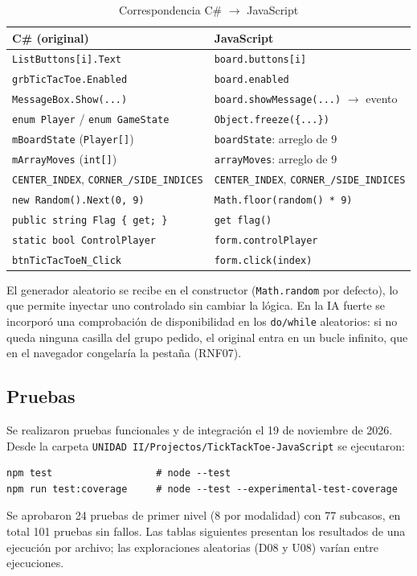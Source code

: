 \documentclass[12pt,a4paper]{article}
\begin{document}
\begin{table}[H]
\centering
\caption{Correspondencia C\# $\rightarrow$ JavaScript}
\small
\begin{tabular}{ll}
\toprule
\textbf{C\# (original)} & \textbf{JavaScript}\\
\midrule
\texttt{ListButtons[i].Text} & \texttt{board.buttons[i]}\\
\texttt{grbTicTacToe.Enabled} & \texttt{board.enabled}\\
\texttt{MessageBox.Show(...)} & \texttt{board.showMessage(...)} $\rightarrow$ evento\\
\texttt{enum Player} / \texttt{enum GameState} & \texttt{Object.freeze(\{...\})}\\
\texttt{mBoardState} (\texttt{Player[]}) & \texttt{boardState}: arreglo de 9\\
\texttt{mArrayMoves} (\texttt{int[]}) & \texttt{arrayMoves}: arreglo de 9\\
\texttt{CENTER\_INDEX}, \texttt{CORNER\_/SIDE\_INDICES} & \texttt{CENTER\_INDEX}, \texttt{CORNER\_/SIDE\_INDICES}\\
\texttt{new Random().Next(0, 9)} & \texttt{Math.floor(random() * 9)}\\
\texttt{public string Flag \{ get; \}} & \texttt{get flag()}\\
\texttt{static bool ControlPlayer} & \texttt{form.controlPlayer}\\
\texttt{btnTicTacToeN\_Click} & \texttt{form.click(index)}\\
\bottomrule
\end{tabular}
\end{table}

El generador aleatorio se recibe en el constructor (\texttt{Math.random} por
defecto), lo que permite inyectar uno controlado sin cambiar la lógica. En la IA
fuerte se incorporó una comprobación de disponibilidad en los \texttt{do/while}
aleatorios: si no queda ninguna casilla del grupo pedido, el original entra en un
bucle infinito, que en el navegador congelaría la pestaña (RNF07).

\subsection{Pruebas}
Se realizaron pruebas funcionales y de integración el 19 de noviembre de 2026.
Desde la carpeta \texttt{UNIDAD II/Projectos/TickTackToe-JavaScript} se ejecutaron:
\begin{lstlisting}
npm test                  # node --test
npm run test:coverage     # node --test --experimental-test-coverage
\end{lstlisting}
Se aprobaron 24 pruebas de primer nivel (8 por modalidad) con 77 subcasos, en
total 101 pruebas sin fallos. Las tablas siguientes presentan los resultados de
una ejecución por archivo; las exploraciones aleatorias (D08 y U08) varían entre
ejecuciones.
\end{document}
